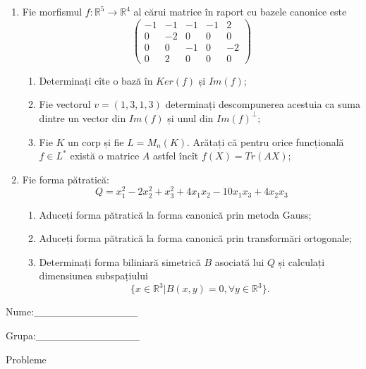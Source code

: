 \documentclass{article}
\begin{document}
\begin{enumerate}
 \item Fie morfismul $f:\mathbb{R}^5 \to \mathbb{R}^4$ al cărui matrice în raport cu bazele canonice este
$$\begin{pmatrix}
-1&-1&-1&-1&2\\
0&-2&0&0&0\\
0&0&-1&0&-2\\
0&2&0&0&0
\end{pmatrix}$$

\begin{enumerate}
\item Determinați cîte o bază în $Ker(f)$ și $Im(f)$;
\item Fie vectorul $v=(1,3,1,3)$ determinați descompunerea acestuia ca suma dintre un vector din $Im(f)$ și unul din $Im(f)^\perp$;
\item Fie $K$ un corp și fie $L=M_n(K)$. Arătați că pentru orice funcțională $f \in L^*$ există o matrice $A$ astfel încît $f(X)=Tr(AX)$;
\end{enumerate}
\item Fie forma pătratică:
$$Q= x_1^2-2x_2^2+x_3^2+4x_1x_2-10x_1x_3+4x_2x_3$$

\begin{enumerate}
\item Aduceți forma pătratică la forma canonică prin metoda Gauss;
\item Aduceți forma pătratică la forma canonică prin transformări ortogonale;
\item Determinați forma biliniară simetrică $B$ asociată lui $Q$ și calculați dimensiunea subspațiului
$$\{x \in \mathbb{R}^3 | B(x,y)=0,\forall y \in \mathbb{R}^3\}.$$

\end{enumerate}
\end{enumerate}
\newpage
\begin{flushright}
Nume:\_\_\_\_\_\_\_\_\_\_\_\_\_\_
 
 
Grupa:\_\_\_\_\_\_\_\_\_\_\_\_\_\_
\end{flushright}
\begin{center}
\vspace{2cm}
{\Large Probleme}
\vspace{2cm}
\end{center}
\end{document}

